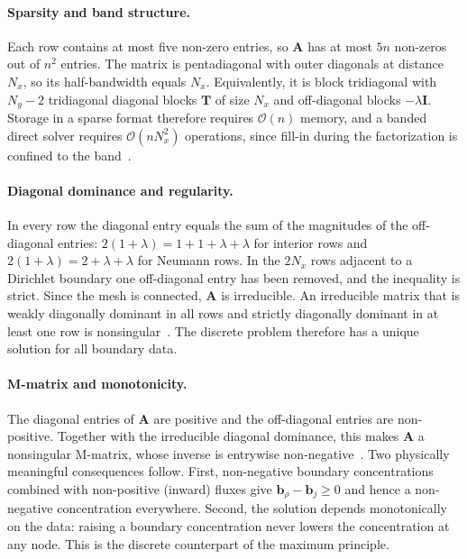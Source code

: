\documentclass[11pt,a4paper]{article}
\numberwithin{equation}{section}
\theoremstyle{definition}
\theoremstyle{remark}
\newcommand{\bigO}[1]{\mathcal{O}\!\left(#1\right)}
\newcommand{\bA}{\mathbf{A}}
\newcommand{\bT}{\mathbf{T}}
\newcommand{\bI}{\mathbf{I}}
\newcommand{\bb}{\bm{b}}
\begin{document}
\paragraph{Sparsity and band structure.} Each row contains at most five non-zero entries,
so $\bA$ has at most $5n$ non-zeros out of $n^2$ entries. The matrix is pentadiagonal with
outer diagonals at distance $N_x$, so its half-bandwidth equals $N_x$. Equivalently, it is
block tridiagonal with $N_y - 2$ tridiagonal diagonal blocks $\bT$ of size $N_x$ and
off-diagonal blocks $-\lambda\bI$. Storage in a sparse format therefore requires
$\bigO{n}$ memory, and a banded direct solver requires $\bigO{nN_x^2}$ operations, since
fill-in during the factorization is confined to the band~\citep{golub2013}.

\paragraph{Diagonal dominance and regularity.} In every row the diagonal entry equals the
sum of the magnitudes of the off-diagonal entries: $2(1 + \lambda) = 1 + 1 + \lambda +
\lambda$ for interior rows and $2(1 + \lambda) = 2 + \lambda + \lambda$ for Neumann rows.
In the $2N_x$ rows adjacent to a Dirichlet boundary one off-diagonal entry has been
removed, and the inequality is strict. Since the mesh is connected, $\bA$ is irreducible.
An irreducible matrix that is weakly diagonally dominant in all rows and strictly
diagonally dominant in at least one row is nonsingular~\citep{varga2000}. The discrete
problem therefore has a unique solution for all boundary data.

\paragraph{M-matrix and monotonicity.} The diagonal entries of $\bA$ are positive and the
off-diagonal entries are non-positive. Together with the irreducible diagonal dominance,
this makes $\bA$ a nonsingular M-matrix, whose inverse is entrywise
non-negative~\citep{varga2000}. Two physically meaningful consequences follow. First,
non-negative boundary concentrations combined with non-positive (inward) fluxes give
$\bb_\rho - \bb_j \ge 0$ and hence a non-negative concentration everywhere. Second, the
solution depends monotonically on the data: raising a boundary concentration never lowers
the concentration at any node. This is the discrete counterpart of the maximum
principle.
\end{document}
